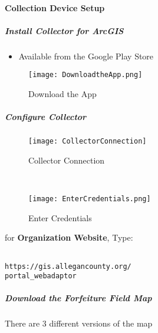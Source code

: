  \paragraph{Collection Device Setup}
 \subparagraph{Install Collector for ArcGIS}
 \begin{itemize}
 \item Available from the Google Play Store
 \end{itemize}
 \begin{figure}[h!]
 \centering
     \texttt{[image: DownloadtheApp.png]}
 \caption{Download the App}
 \end{figure}
 \clearpage
 \subparagraph[Configure Collector]{\Large Configure Collector}
 \begin{wrapfigure}{r}{0.5\textwidth}
 \centering
 \texttt{[image: CollectorConnection]}
 \caption{Collector Connection}

 \HRule \\[.4cm] %
 \vspace{.1in}

     \texttt{[image: EnterCredentials.png]}
 \vspace{-.1in}

 \caption{Enter Credentials}
 \end{wrapfigure}


 for \textbf{Organization Website}, Type:
 \vspace{.25in}

\begin{verbatim}

https://gis.allegancounty.org/
portal_webadaptor

\end{verbatim}

 \vspace{.5in}

\vspace{2.75in}

 \vspace{1in}


 \clearpage
 \subparagraph[Download the Forfeiture Field Map]{Download the Forfeiture Field Map \texorpdfstring{\\}{}}
 \noindent There are 3 different versions of the map
 \vspace{.05in}


